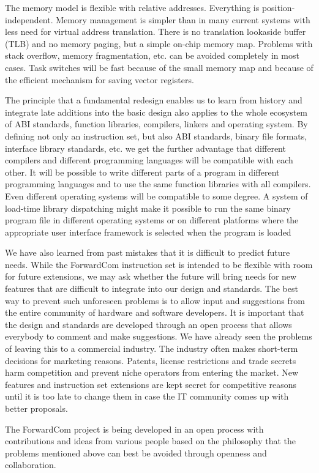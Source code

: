 \documentclass[forwardcom.tex]{subfiles}
\begin{document}
The memory model is flexible with relative addresses. Everything is position-independent. Memory management is simpler than in many current systems with less need for virtual address translation. There is no translation lookaside buffer (TLB) and no memory paging, but a simple on-chip memory map. Problems with stack overflow, memory fragmentation, etc. can be avoided completely in most cases. Task switches will be fast because of the small memory map and because of the efficient mechanism for saving vector registers. 
\vspace{2mm}

The principle that a fundamental redesign enables us to learn from history and integrate late additions into the basic design also applies to the whole ecosystem of ABI standards, function libraries, compilers, linkers and operating system. By defining not only an instruction set, but also ABI standards, binary file formats, interface library standards, etc. we get the further advantage that different compilers and different programming languages will be compatible with each other. It will be possible to write different parts of a program in different programming languages and to use the same function libraries with all compilers. Even different operating systems will be compatible to some degree. A system of load-time library dispatching might make it possible to run the same binary program file in different operating systems or on different platforms where the appropriate user interface framework is selected when the program is loaded
\vspace{2mm}

We have also learned from past mistakes that it is difficult to predict future needs. While the ForwardCom instruction set is intended to be flexible with room for future extensions, we may ask whether the future will bring needs for new features that are difficult to integrate into our design and standards. The best way to prevent such unforeseen problems is to allow input and suggestions from the entire community of hardware and software developers. It is important that the design and standards are developed through an open process that allows everybody to comment and make suggestions. We have already seen the problems of leaving this to a commercial industry. The industry often makes short-term decisions for marketing reasons. Patents, license restrictions and trade secrets harm competition and prevent niche operators from entering the market. New features and instruction set extensions are kept secret for competitive reasons until it is too late to change them in case the IT community comes up with better proposals.
\vspace{2mm}

The ForwardCom project is being developed in an open process with contributions and ideas from various people based on the philosophy that the problems mentioned above can best be avoided through openness and collaboration.
\end{document}
